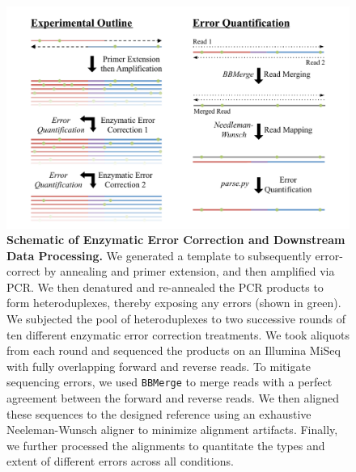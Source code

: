 \documentclass[letterpaper,12pt]{article}
\begin{document}
\clearpage
\begin{figure}[t]
\centering
\includegraphics[width=174mm]{Figure_1.pdf}
    \caption{\small \textbf{Schematic of Enzymatic Error Correction and Downstream Data Processing.} We generated a template to subsequently error-correct by annealing and primer extension, and then amplified via PCR. We then denatured and re-annealed the PCR products to form heteroduplexes, thereby exposing any errors (shown in green). We subjected the pool of heteroduplexes to two successive rounds of ten different enzymatic error correction treatments. We took aliquots from each round and sequenced the products on an Illumina MiSeq with fully overlapping forward and reverse reads. To mitigate sequencing errors, we used \texttt{BBMerge} to merge reads with a perfect agreement between the forward and reverse reads. We then aligned these sequences to the designed reference using an exhaustive Neeleman-Wunsch aligner to minimize alignment artifacts. Finally, we further processed the alignments to quantitate the types and extent of different errors across all conditions.}
\label{fig:intro}
\end{figure}

\end{document}
